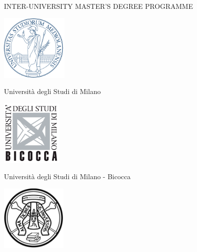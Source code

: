 \frenchspacing
\frontmatter



\begin{titlepage}

\thispagestyle{empty}

\begin{center}
\vskip 1cm
{\large INTER-UNIVERSITY MASTER'S DEGREE PROGRAMME}

\vskip 1cm
\begin{minipage}[t]{18cm}%
\begin{center}%
\begin{minipage}[t]{4cm}%
\begin{center}
\includegraphics[height=3.2cm]{logos/logo-unimi}%

\Large Universit\`a degli Studi di Milano
\end{center}
\end{minipage}%
\hspace{1.5cm}%
\begin{minipage}[t]{6cm}%
\begin{center}
\includegraphics[height=3.2cm]{logos/logo-unimib}%

\Large Universit\`a degli Studi di Milano - Bicocca
\end{center}
\end{minipage}%
\hspace{1.5cm}%
\begin{minipage}[t]{4cm}%
\begin{center}
\includegraphics[height=3.2cm]{logos/logo-unipv-bw}


\end{center}
\end{minipage}
\end{center}
\end{minipage}
\end{center}
\end{titlepage}
